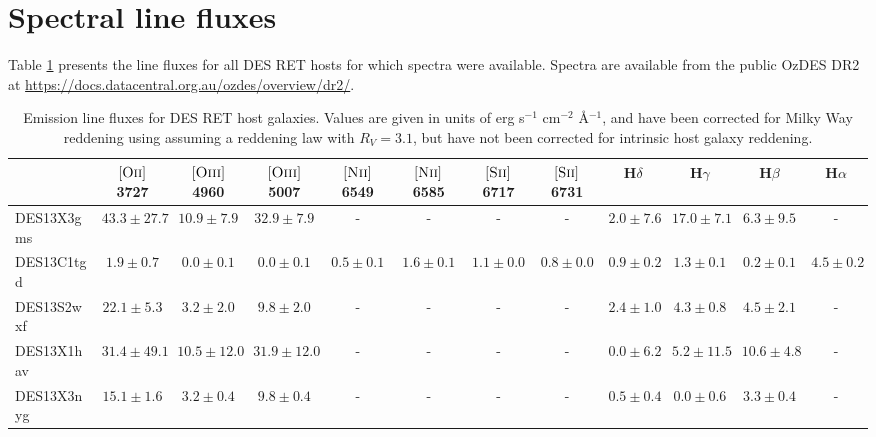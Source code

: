 \documentclass[fleqn,usenatbib,]{mnras}
\newcommand{\halpha}[0]{H$\alpha$}
\newcommand{\hbeta}[0]{H$\beta$}
\newcommand{\hgamma}[0]{H$\gamma$}
\newcommand{\hdelta}[0]{H$\delta$}
\newcommand{\OII}[0]{$[\textnormal{\textsc{Oii}}]$}
\newcommand{\OIII}[0]{$[\textnormal{\textsc{Oiii}}]$}
\newcommand{\SII}[0]{$[\textnormal{\textsc{Sii}}]$}
\newcommand{\NII}[0]{$[\textnormal{\textsc{Nii}}]$}
\begin{document}

\newpage
\appendix
\onecolumn
\section{Spectral line fluxes}
Table \ref{tab:fluxes} presents the line fluxes for all DES RET hosts for which spectra were available. Spectra are available from the public OzDES DR2 at \url{https://docs.datacentral.org.au/ozdes/overview/dr2/}.

\begin{table}

\caption{Emission line fluxes for DES RET host galaxies. Values are given in units of erg s$^{-1}$ cm$^{-2}$ \AA$^{-1}$, and have been corrected for Milky Way reddening using \citet{Schlegel1998} assuming a \citet{Cardelli1989} reddening law with $R_V = 3.1$, but have not been corrected for intrinsic host galaxy reddening.\label{tab:fluxes}}
\setlength{\tabcolsep}{3pt}
\begin{tabular}{lccccccccccc}
\toprule
{} &              \OII 3727 &             \OIII 4960 &              \OIII 5007 &             \NII 6549 &             \NII 6585 &             \SII 6717 &             \SII 6731 &           \hdelta &            \hgamma &             \hbeta &            \halpha \\
\midrule
DES13X3gms &  $43.3 \pm 27.7$ &   $10.9 \pm 7.9$ &    $32.9 \pm 7.9$ &               - &               - &               - &               - &   $2.0 \pm 7.6$ &   $17.0 \pm 7.1$ &    $6.3 \pm 9.5$ &                - \\
DES13C1tgd &    $1.9 \pm 0.7$ &    $0.0 \pm 0.1$ &     $0.0 \pm 0.1$ &   $0.5 \pm 0.1$ &   $1.6 \pm 0.1$ &   $1.1 \pm 0.0$ &   $0.8 \pm 0.0$ &   $0.9 \pm 0.2$ &    $1.3 \pm 0.1$ &    $0.2 \pm 0.1$ &    $4.5 \pm 0.2$ \\
DES13S2wxf &   $22.1 \pm 5.3$ &    $3.2 \pm 2.0$ &     $9.8 \pm 2.0$ &               - &               - &               - &               - &   $2.4 \pm 1.0$ &    $4.3 \pm 0.8$ &    $4.5 \pm 2.1$ &                - \\
DES13X1hav &  $31.4 \pm 49.1$ &  $10.5 \pm 12.0$ &   $31.9 \pm 12.0$ &               - &               - &               - &               - &   $0.0 \pm 6.2$ &   $5.2 \pm 11.5$ &   $10.6 \pm 4.8$ &                - \\
DES13X3nyg &   $15.1 \pm 1.6$ &    $3.2 \pm 0.4$ &     $9.8 \pm 0.4$ &               - &               - &               - &               - &   $0.5 \pm 0.4$ &    $0.0 \pm 0.6$ &    $3.3 \pm 0.4$ &                - \\

\end{tabular}
\end{table}
\end{document}
